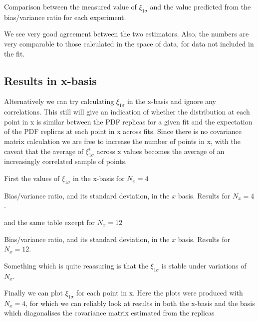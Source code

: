 \begin{table}[h!]
    \label{tab:pdf_xicomp_nx4}
    
    \caption{Comparison between the measured value of $\xi_{1\sigma}$ and the value predicted from the bias/variance ratio for each experiment.}
\end{table}

We see very good agreement between the two estimators. Also, the numbers
are very comparable to those calculated in the space of data, for data not
included in the fit.

\subsection{Results in x-basis}

Alternatively we can try calculating $\xi_{1\sigma}$ in the x-basis and ignore
any correlations. This still will give an indication of whether the distribution
at each point in x is similar between the PDF replicas for a given fit and the 
expectation of the PDF replicas at each point in x across fits. Since there
is no covariance matrix calculation we are free to increase the number of points
in x, with the caveat that the average of $\xi_{1\sigma}^i$ across x values
becomes the average of an increasingly correlated sample of points.

First the values of $\xi_{1\sigma}$ in the x-basis for $N_x=4$

\begin{table}[h!]
    \label{tab:xbasis_xi_nx4}
    
    \caption{Bias/variance ratio, and its standard deviation, in the $x$ basis. Results for $N_x=4$. }
\end{table}

\FloatBarrier

and the same table except for $N_x=12$

\begin{table}[h!]
    \label{tab:xbasis_xi_nx12}
    
    \caption{Bias/variance ratio, and its standard deviation, in the $x$ basis. Results for $N_x=12$. }
\end{table}

\FloatBarrier

Something which is quite reassuring is that the $\xi_{1\sigma}$ is stable under
variations of $N_x$.

Finally we can plot $\xi_{1\sigma}$ for each point in x. Here the plots were
produced with $N_x=4$, for which we can reliably look at results in both the
x-basis and the basis which diagonalises the covariance matrix estimated
from the replicas

